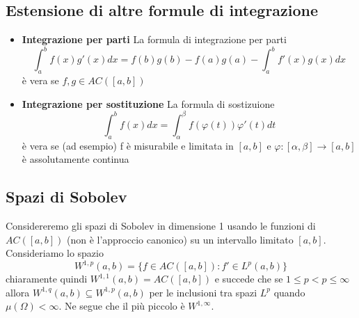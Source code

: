 \subsection{Estensione di altre formule di integrazione}
\begin{itemize}[label = --]
    \item \textbf{Integrazione per parti} La formula di integrazione per parti
\[
    \int_{a} ^{b} f{(x)} g'{(x)}dx = f{(b)}g{(b)} - f{(a)}g{(a)} - \int_{a} ^{b}
    f'{(x)}g{(x)}dx
\]
    è vera se \(f, g \in AC([a,b])\) 
    \item \textbf{Integrazione per sostituzione} La formula di sostizuione
\[
    \int_a^{b} f{(x)} dx = \int_\alpha ^{\beta} f{(\varphi{(t)})}
    \varphi'{(t)}dt
\]
è vera se (ad esempio) f è misurabile e limitata in \([a,b]\) e \(\varphi :
[\alpha, \beta] \to [a,b]\) è assolutamente continua
\end{itemize}
\subsection{Spazi di Sobolev}
Considereremo gli spazi di Sobolev in dimensione 1 usando le funzioni di
\(AC([a,b])\) (non è l'approccio canonico) su un intervallo limitato \([a,b]\).
Consideriamo lo spazio
\[
    W^{1,p}(a,b) = \{f \in AC([a,b]): f' \in L^{p}(a,b)\} 
\]
chiaramente quindi \(W^{1,1}{(a,b)} = AC{([a,b])}\) e succede che se \(1 \le p <
p \le \infty\) allora \(W^{1,q}{(a,b)} \subseteq W^{1,p}{(a,b)} \) per le
inclusioni tra spazi \(L^{p}\) quando \(\mu{(\Omega)} < \infty\). Ne segue che
il più piccolo è \(W^{1, \infty}\).

